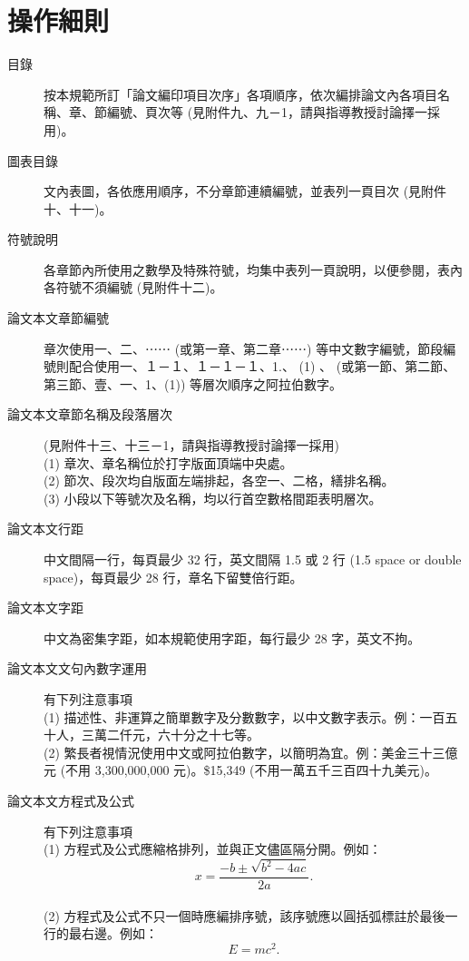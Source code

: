 \section{操作細則}

\begin{description}
\item[目錄] 按本規範所訂「論文編印項目次序」各項順序，依次編排論文內各項目名稱、章、節編號、頁次等 (見附件九、九－1，請與指導教授討論擇一採用)。
\item[圖表目錄] 文內表圖，各依應用順序，不分章節連續編號，並表列一頁目次 (見附件十、十一)。
\item[符號說明] 各章節內所使用之數學及特殊符號，均集中表列一頁說明，以便參閱，表內各符號不須編號 (見附件十二)。
\item[論文本文章節編號] 章次使用一、二、⋯⋯ (或第一章、第二章⋯⋯) 等中文數字編號，節段編號則配合使用一、１－１、１－１－１、1.、 (1) 、 (或第一節、第二節、第三節、壹、一、1、(1)) 等層次順序之阿拉伯數字。
\item[論文本文章節名稱及段落層次] (見附件十三、十三－1，請與指導教授討論擇一採用)\\
(1) 章次、章名稱位於打字版面頂端中央處。\\
(2) 節次、段次均自版面左端排起，各空一、二格，繕排名稱。\\
(3) 小段以下等號次及名稱，均以行首空數格間距表明層次。
\item[論文本文行距] 中文間隔一行，每頁最少 32 行，英文間隔 1.5 或 2 行 (1.5 space or double space)，每頁最少 28 行，章名下留雙倍行距。
\item[論文本文字距] 中文為密集字距，如本規範使用字距，每行最少 28 字，英文不拘。
\item[論文本文文句內數字運用] 有下列注意事項\\
(1) 描述性、非運算之簡單數字及分數數字，以中文數字表示。例：一百五十人，三萬二仟元，六十分之十七等。\\
(2) 繁長者視情況使用中文或阿拉伯數字，以簡明為宜。例：美金三十三億元 (不用 3,300,000,000 元)。\$15,349 (不用一萬五千三百四十九美元)。
\item[論文本文方程式及公式] 有下列注意事項\\
(1) 方程式及公式應縮格排列，並與正文儘區隔分開。例如：
\[ x = \frac{-b \pm \sqrt{b^2 -4ac}}{2a}. \]\\
(2) 方程式及公式不只一個時應編排序號，該序號應以圓括弧標註於最後一行的最右邊。例如：
\begin{equation}
E = mc^2.
\end{equation}\\

\end{description}
